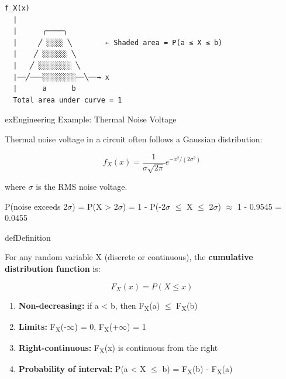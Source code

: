 

\begin{PSplaincode}
\begin{Verbatim}
f_X(x)
  |
  |      ╭────╮
  |     ╱ ░░░░ ╲        ← Shaded area = P(a ≤ X ≤ b)
  |    ╱ ░░░░░░ ╲
  |   ╱ ░░░░░░░░ ╲
  |──╱───░░░░░░░░──╲──→ x
  |      a      b
  Total area under curve = 1
\end{Verbatim}
\end{PSplaincode}

\begin{PSbox}[unbreakable]{ex}{Engineering Example: Thermal Noise Voltage}

Thermal noise voltage in a circuit often follows a Gaussian distribution:

\[f_X(x) = \frac{1}{\sigma\sqrt{2\pi}} e^{-x^2/(2\sigma^2)}\]

where \ensuremath{\sigma} is the RMS noise voltage.

P(noise exceeds 2\ensuremath{\sigma}) = P(\textbar{}X\textbar{} \textgreater{} 2\ensuremath{\sigma}) = 1 - P(-2\ensuremath{\sigma} \ensuremath{\le} X \ensuremath{\le} 2\ensuremath{\sigma}) \ensuremath{\approx} 1 - 0.9545 = 0.0455

\end{PSbox}


\begin{PSbox}[unbreakable]{def}{Definition}

For any random variable X (discrete or continuous), the \textbf{cumulative distribution function} is:

\[F_X(x) = P(X \leq x)\]

\end{PSbox}


\begin{enumerate}
\def\labelenumi{\arabic{enumi}.}
\tightlist
\item
  \textbf{Non-decreasing:} if a \textless{} b, then F\textsubscript{X}(a) \ensuremath{\le} F\textsubscript{X}(b)
\item
  \textbf{Limits:} F\textsubscript{X}(-\ensuremath{\infty}) = 0, F\textsubscript{X}(+\ensuremath{\infty}) = 1
\item
  \textbf{Right-continuous:} F\textsubscript{X}(x) is continuous from the right
\item
  \textbf{Probability of interval:} P(a \textless{} X \ensuremath{\le} b) = F\textsubscript{X}(b) - F\textsubscript{X}(a)
\end{enumerate}

